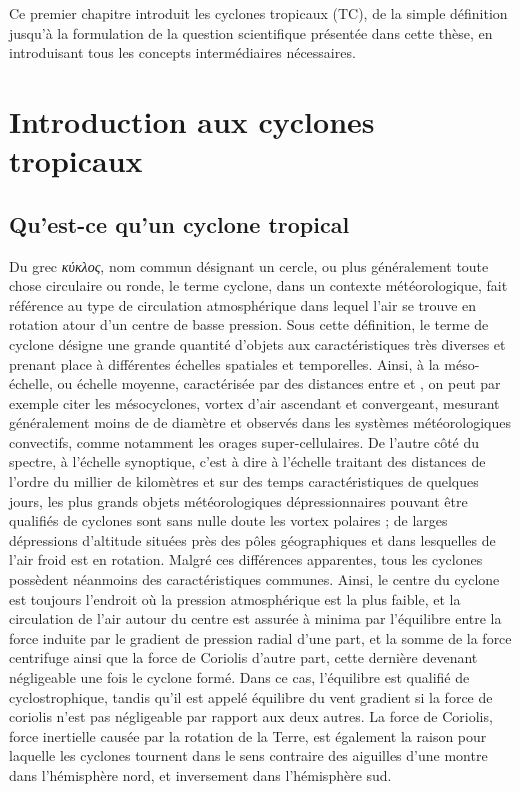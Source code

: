 \documentclass[../main.tex]{subfiles}
\begin{document}
\begin{itshape}
Ce premier chapitre introduit les cyclones tropicaux (TC), de la simple définition jusqu'à la formulation de la question scientifique présentée dans cette thèse, en introduisant tous les concepts intermédiaires nécessaires.
\end{itshape}

\minitoc\newpage
\section{Introduction aux cyclones tropicaux}

\subsection{Qu'est-ce qu'un cyclone tropical}\label{sec:quest_ce_qu_un_cyclone}

Du grec \textit{κύκλος}, nom commun désignant un cercle, ou plus généralement toute chose circulaire ou ronde, le terme cyclone, dans un contexte
météorologique, fait référence au type de circulation atmosphérique dans lequel l'air se trouve en rotation atour d'un centre de basse pression. Sous cette
définition, le terme de cyclone désigne une grande quantité d'objets aux caractéristiques très diverses et prenant place à différentes échelles spatiales et
temporelles. Ainsi, à la méso-échelle, ou échelle moyenne, caractérisée par des distances entre  et , on peut par exemple citer les mésocyclones,
vortex d'air ascendant et convergeant, mesurant généralement moins de  de diamètre et observés dans les systèmes météorologiques convectifs, comme
notamment les orages super-cellulaires. De l'autre côté du spectre, à l'échelle synoptique, c'est à dire à l'échelle traitant des distances de l'ordre du
millier de kilomètres et sur des temps caractéristiques de quelques jours, les plus grands objets météorologiques dépressionnaires pouvant être qualifiés de
cyclones sont sans nulle doute les vortex polaires ; de larges dépressions d'altitude situées près des pôles géographiques et dans lesquelles de l'air froid est
en rotation. Malgré ces différences apparentes, tous les cyclones possèdent néanmoins des caractéristiques communes. Ainsi, le centre du cyclone est toujours
l'endroit où la pression atmosphérique est la plus faible, et la circulation de l'air autour du centre est assurée à minima par l'équilibre entre la force
induite par le gradient de pression radial d'une part, et la somme de la force centrifuge ainsi que la force de Coriolis d'autre part, cette dernière devenant négligeable
une fois le cyclone formé. Dans ce cas, l'équilibre est qualifié de cyclostrophique, tandis qu'il est appelé équilibre du vent gradient si la force de coriolis
n'est pas négligeable par rapport aux deux autres. La force de Coriolis, force inertielle causée par la rotation de la Terre, est également la raison pour laquelle
les cyclones tournent dans le sens contraire des aiguilles d'une montre dans l'hémisphère nord, et inversement dans l'hémisphère sud.
\end{document}
